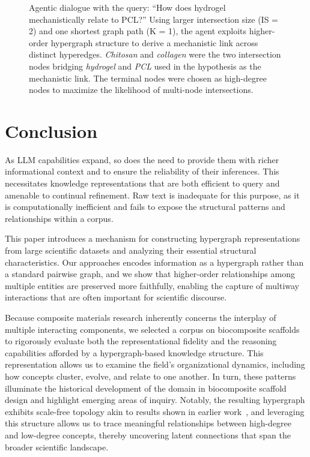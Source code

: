 \documentclass{article}
\begin{document}
\begin{figure}[htbp]
\centering
\small
\caption{Agentic dialogue with the query: “How does hydrogel mechanistically relate to PCL?” Using larger intersection size (IS = 2) and one shortest graph path (K = 1), the agent exploits higher-order hypergraph structure to derive a mechanistic link across distinct hyperedges. \textit{Chitosan} and \textit{collagen} were the two intersection nodes bridging \textit{hydrogel} and \textit{PCL} used in the hypothesis as the mechanistic link. The terminal nodes were chosen as high-degree nodes to maximize the likelihood of multi-node intersections.
}
\label{fig:hydrogel}
\end{figure}




\section{Conclusion}\label{sec5}

As LLM capabilities expand, so does the need to provide them with richer informational context and to ensure the reliability of their inferences. This necessitates knowledge representations that are both efficient to query and amenable to continual refinement. Raw text is inadequate for this purpose, as it is computationally inefficient and fails to expose the structural patterns and relationships within a corpus.

This paper introduces a mechanism for constructing hypergraph representations from large scientific datasets and analyzing their essential structural characteristics. Our approaches encodes information as a hypergraph rather than a standard pairwise graph, and we show that higher-order relationships among multiple entities are preserved more faithfully, enabling the capture of multiway interactions that are often important for scientific discourse.

Because composite materials research inherently concerns the interplay of multiple interacting components, we selected a corpus on biocomposite scaffolds to rigorously evaluate both the representational fidelity and the reasoning capabilities afforded by a hypergraph-based knowledge structure. This representation allows us to examine the field’s organizational dynamics, including how concepts cluster, evolve, and relate to one another. In turn, these patterns illuminate the historical development of the domain in biocomposite scaffold design and highlight emerging areas of inquiry. Notably, the resulting hypergraph exhibits scale-free topology akin to results shown in earlier work~\cite{Buehler2024, Ghafarollahi2024}, and leveraging this structure allows us to trace meaningful relationships between high-degree and low-degree concepts, thereby uncovering latent connections that span the broader scientific landscape.
\end{document}
